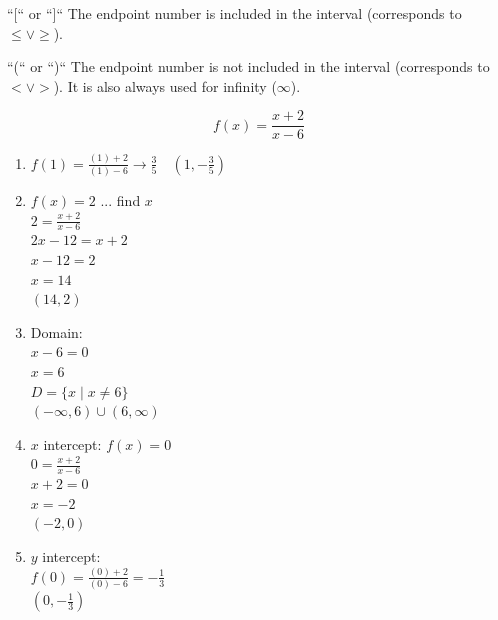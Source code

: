 \begin{definition}
  ``[`` or ``]`` The endpoint number is included in the interval (corresponds to $\le \lor \ge$).
\end{definition}

\begin{definition}
  ``(`` or ``)`` The endpoint number is not included in the interval (corresponds to $< \lor >$). It is also always used for infinity ($\infty$).
\end{definition}

\begin{example}[Algebraic]
  $$f(x) = \frac{x + 2}{x - 6}$$
  \begin{enumerate}
  \item $f(1) = \frac{(1) + 2}{(1)- 6} \to \frac{3}{5} \quad \left(1, -\frac{3}{5}\right)$
  \item $f(x) = 2$ ... find $x$\\
    $2 = \frac{x + 2}{x - 6}$ \\
    $2x - 12 = x + 2$ \\
    $x - 12 = 2$ \\
    $x = 14$ \\
    $(14, 2)$
  \item Domain: \\
    $x - 6 = 0$ \\
    $x = 6$\\
    $D = \{x \mid x \ne 6\}$ \\
    $(-\infty, 6) \cup (6, \infty)$
  \item $x$ intercept:
    $f(x) = 0$ \\
    $0 = \frac{x + 2}{x - 6}$ \\
    $x + 2 = 0$ \\
    $x = -2$ \\
    $(-2, 0)$
  \item $y$ intercept: \\
    $f(0) = \frac{(0) + 2}{(0) - 6} = -\frac{1}{3}$ \\
    $\left(0, -\frac{1}{3}\right)$
  \end{enumerate}
\end{example}
